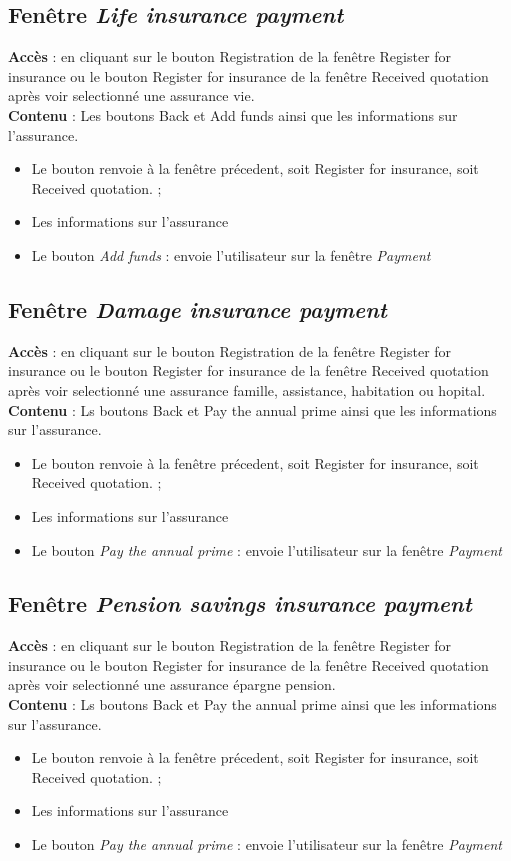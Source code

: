 \documentclass{article}
\newcommand{\navbutton}[2]{Le bouton \emph{#1} : envoie l'utilisateur sur la fenêtre \emph{#2}}
\newcommand{\access}[1]{ \noindent\textbf{Accès} : #1 \\}
\newcommand{\content}[1]{\textbf{Contenu} : #1}
\begin{document}
\subsection{Fenêtre \emph{Life insurance payment}}
\access{en cliquant sur le bouton Registration de la fenêtre Register for insurance ou le bouton Register for insurance de la fenêtre Received quotation après voir selectionné une assurance vie.}
\content{Les boutons Back et Add funds ainsi que les informations sur l'assurance.}
\begin{itemize}
\item Le bouton renvoie à la fenêtre précedent, soit Register for insurance, soit Received quotation. ;
\item Les informations sur l'assurance
\item \navbutton{Add funds}{Payment}
\end{itemize}



\subsection{Fenêtre \emph{Damage insurance payment}}
\access{en cliquant sur le bouton Registration de la fenêtre Register for insurance ou le bouton Register for insurance de la fenêtre Received quotation après voir selectionné une assurance famille, assistance, habitation ou hopital.}
\content{Ls boutons Back et Pay the annual prime ainsi que les informations sur l'assurance.}
\begin{itemize}
    \item Le bouton renvoie à la fenêtre précedent, soit Register for insurance, soit Received quotation. ;
    \item Les informations sur l'assurance
    \item \navbutton{Pay the annual prime}{Payment}
\end{itemize}

\subsection{Fenêtre \emph{Pension savings insurance payment}}
\access{en cliquant sur le bouton Registration de la fenêtre Register for insurance ou le bouton Register for insurance de la fenêtre Received quotation après voir selectionné une assurance épargne pension.}
\content{Ls boutons Back et Pay the annual prime ainsi que les informations sur l'assurance.}
\begin{itemize}
    \item Le bouton renvoie à la fenêtre précedent, soit Register for insurance, soit Received quotation. ;
    \item Les informations sur l'assurance
    \item \navbutton{Pay the annual prime}{Payment}
\end{itemize}
\end{document}
